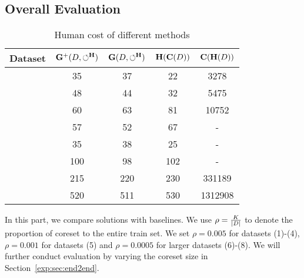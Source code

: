 


\subsection{Overall Evaluation}\label{exp:sec:overall}

\begin{table}
	\centering
	\caption{Human cost of different methods}
	\vspace{-1.2em}
	\small
	\begin{tabular}{ccccc}
		\hline
		Dataset & $\mathbf{G}^+(D,\circlearrowleft^\mathbf{H})$ & $\mathbf{G}(D,\circlearrowleft^\mathbf{H})$ & $\mathbf{H}(\mathbf{C}(D))$ & $\mathbf{C}(\mathbf{H}(D))$\\
		\hline
		\nursery & 35 & 37 & 22 & 3278\\
		\hr & 48 & 44 & 32 & 5475\\
		\adult & 60 & 63 & 81 & 10752\\
		\credit & 57 & 52 & 67 & -\\
		\bike & 35 & 38 & 25 & -\\
		\air & 100 & 98 & 102 & -\\
		\imdb & 215 & 220 & 230 & 331189\\
		\imdbl & 520 & 511 & 530 & 1312908 \\
		\hline
	\end{tabular}
	\label{tbl:humancost}
	\vspace{-1em}
\end{table}





In this part, we compare \ours solutions with baselines. We use $\rho = \frac{K}{|D|}$ to denote the proportion of coreset  to the entire train set.  %
We set  $\rho=0.005$ for datasets (1)-(4), $\rho=0.001$ for datasets (5) and  $\rho=0.0005$ for larger datasets (6)-(8).
 We  will further  conduct evaluation by varying the coreset size  in Section~\ref{exp:sec:end2end}.









